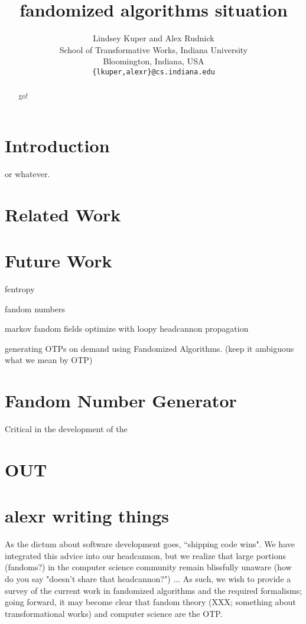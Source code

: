 \documentclass[11pt,twocolumn]{article}
\title{fandomized algorithms situation}
\author{Lindsey Kuper and Alex Rudnick \\
  School of Transformative Works, Indiana University \\
  Bloomington, Indiana, USA\\
  {\tt \{lkuper,alexr\}@cs.indiana.edu} }
\date{}
\begin{document}
\maketitle

\begin{abstract}
go!
\end{abstract}

\section{Introduction}
\cite{DBLP:books/daglib/0067131} or whatever.

\section{Related Work}


\section{Future Work}
fentropy

fandom numbers

markov fandom fields
optimize with loopy headcannon propagation

generating OTPs on demand using Fandomized Algorithms. (keep it ambiguous what
we mean by OTP)

\section{Fandom Number Generator}
Critical in the development of the 

\section{OUT}

\section{alexr writing things}
As the dictum about software development goes, ``shipping code wins". We have
integrated this advice into our headcannon, but we realize that large portions
(fandoms?) in the computer science community remain blissfully unaware (how do
you say "doesn't share that headcannon?") ...
As such, we wish to provide a survey of the current work in fandomized
algorithms and the required formalisms; going forward, it may become clear that
fandom theory (XXX; something about transformational works) and computer
science are the OTP.
\end{document}
